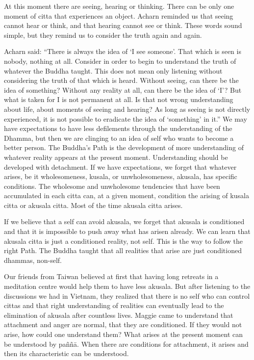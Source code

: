 At this moment there are seeing, hearing or thinking. There can be only one 
moment of citta that experiences an object. Acharn reminded us that seeing 
cannot hear or think, and that hearing cannot see or think. These words sound 
simple, but they remind us to consider the truth again and again. 

Acharn said: ``There is always the idea of `I see someone'. That which is seen is 
nobody, nothing at all. Consider in order to begin to understand the truth of 
whatever the Buddha taught. This does not mean only listening without considering the truth of that which is heard. Without seeing, can there be the idea of 
something? Without any reality at all, can there be the idea of `I'? But what is 
taken for I is not permanent at all. Is that not wrong understanding about life, 
about moments of seeing and hearing? As long as seeing is not directly experienced, it is not possible to eradicate the idea of `something' in it.'' 
We may have expectations to have less defilements through the understanding 
of the Dhamma, but then we are clinging to an idea of self who wants to become a better person. The Buddha's Path is the development of more understanding of whatever reality appears at the present moment. Understanding 
should be developed with detachment. If we have expectations, we forget that 
whatever arises, be it wholesomeness, kusala, or unwholesomeness, akusala, has 
specific conditions. The wholesome and unwholesome tendencies that have 
been accumulated in each citta can, at a given moment, condition the arising of 
kusala citta or akusala citta. Most of the time akusala citta arises. 

If we believe that a self can avoid akusala, we forget that akusala is conditioned 
and that it is impossible to push away what has arisen already. We can learn that 
akusala citta is just a conditioned reality, not self. This is the way to follow the 
right Path. The Buddha taught that all realities that arise are just conditioned 
dhammas, non-self. 

Our friends from Taiwan believed at first that having long retreats in a meditation centre would help them to have less akusala. But after listening to the discussions we had in Vietnam, they realized that there is no self who can control 
cittas and that right understanding of realities can eventually lead to the elimination of akusala after countless lives. Maggie came to understand that attachment 
and anger are normal, that they are conditioned. If they would not arise, how 
could one understand them? What arises at the present moment can be understood by paññā. When there are conditions for attachment, it arises and then its 
characteristic can be understood. 

